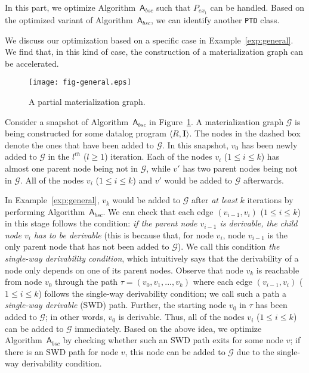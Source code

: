 \documentclass[final,1p,times]{elsarticle}
\begin{document}
In this part, we optimize Algorithm~$\mathsf{A}_{bsc}$ such that $P_{ex_1}$
can be handled. Based on the optimized variant of Algorithm~$\mathsf{A}_{bsc}$,
we can identify another \texttt{PTD} class.

We discuss our optimization based on a specific case in Example~\ref{exp:general}.
We find that, in this kind of case, the construction of a materialization graph can be accelerated.

\begin{figure}[htbp]
\begin{center}
\texttt{[image: fig-general.eps]}
\caption{A partial materialization graph.}
\label{fig:general}
\end{center}
\end{figure}

\begin{example}\label{exp:general}
Consider a snapshot of Algorithm~$\mathsf{A}_{bsc}$ in
Figure~\ref{fig:general}. A materialization graph $\mathcal{G}$
is being constructed for some datalog program $\langle R, \textbf{I}\rangle$.
The nodes in the dashed box denote the ones that have been added to $\mathcal{G}$.
In this snapshot, $v_0$ has been newly added
to $\mathcal{G}$ in the $l^{th}$ ($l\geq 1$) iteration.
Each of the nodes $v_i$ ($1\leq i\leq k$) has almost one parent node being not in $\mathcal{G}$,
while $v'$ has two parent nodes being not in $\mathcal{G}$.
All of the nodes $v_i$ ($1\leq i\leq k$) and $v'$ would be added to $\mathcal{G}$
afterwards.
\end{example}


In Example~\ref{exp:general}, $v_k$ would be added to $\mathcal{G}$ after \emph{at least} $k$
iterations by performing Algorithm~$\mathsf{A}_{bsc}$.
We can check that each edge $(v_{i-1},v_i)$ ($1\leq i\leq k$) in this stage follows the condition:
\emph{if the parent node $v_{i-1}$ is derivable, the child node $v_i$ has to be derivable} (this
is because that, for node $v_i$, node $v_{i-1}$ is the only parent node that has not been added to $\mathcal{G}$).
We call this condition \emph{the single-way derivability condition}, which intuitively says that the derivability of a
node only depends on one of its parent nodes.
Observe that node $v_k$ is reachable from node $v_0$ through the path $\tau=(v_0,v_1,...,v_k)$ where
each edge $(v_{i-1},v_i)$ ($1\leq i\leq k$) follows the single-way derivability condition;
we call such a path a \emph{single-way derivable} (SWD) path.
Further, the starting node $v_0$ in $\tau$ has been added to $\mathcal{G}$; in other words,
$v_0$ is derivable. Thus, all of the nodes $v_i$ ($1\leq i\leq k$) can be added to
$\mathcal{G}$ immediately.
Based on the above idea, we optimize Algorithm~$\mathsf{A}_{bsc}$ by checking whether such an SWD path
exits for some node $v$; if there is an SWD path for node $v$, this node can be added to $\mathcal{G}$
due to the single-way derivability condition.
\end{document}
